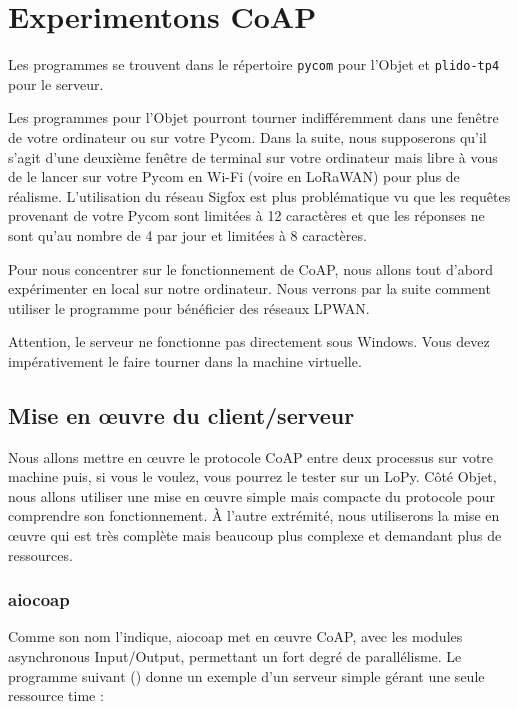 \cleardoublepage
\chapter{Experimentons CoAP}

Les programmes se trouvent dans le répertoire \texttt{pycom} pour l'Objet et \texttt{plido-tp4} pour le serveur.

Les programmes pour l'Objet pourront tourner indifféremment dans une fenêtre de votre ordinateur ou sur votre Pycom. Dans la suite, nous supposerons qu'il s'agit d'une deuxième fenêtre de terminal sur votre ordinateur mais libre à vous de le lancer sur votre Pycom en Wi-Fi (voire en LoRaWAN) pour plus de réalisme. L'utilisation du réseau Sigfox est plus problématique vu que les requêtes provenant de votre Pycom sont limitées à 12 caractères et que les réponses ne sont qu'au nombre de 4 par jour et limitées à 8 caractères. 

Pour nous concentrer sur le fonctionnement de CoAP, nous allons tout d'abord expérimenter en local sur notre ordinateur. Nous verrons par la suite comment utiliser le programme   pour bénéficier des réseaux LPWAN.

Attention, le serveur ne fonctionne pas directement sous Windows. Vous devez impérativement le faire tourner dans la machine virtuelle.

\section{Mise en œuvre du client/serveur}


 \begin{figure}
\end{figure}

Nous allons mettre en œuvre le protocole CoAP entre deux processus sur votre machine puis, si vous le voulez, vous pourrez le tester sur un LoPy. Côté Objet, nous allons utiliser une mise en œuvre simple mais compacte du protocole pour comprendre son fonctionnement. À l’autre extrémité, nous utiliserons la mise en œuvre  qui est très complète mais beaucoup plus complexe et demandant plus de ressources.

\subsection{aiocoap}

Comme son nom l'indique, aiocoap met en œuvre CoAP, avec les modules asynchronous Input/Output, permettant un fort degré de parallélisme. Le programme suivant () donne un exemple d’un serveur simple gérant une seule ressource time :

